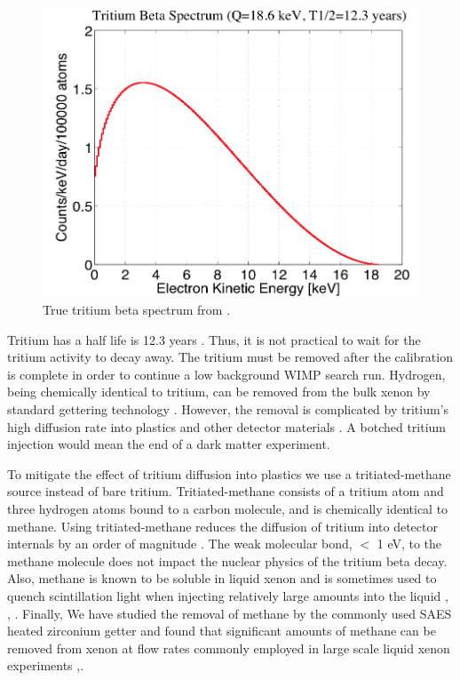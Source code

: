 \begin{figure}[h!]\centering
\includegraphics[width=120mm]{Tritium_Source/Tritium_Spectrum.png}
\caption{True tritium beta spectrum from \cite{Tritium_Eq}. }
\label{fig:True_T_Spec}
\end{figure}


Tritium has a half life is 12.3 years \cite{Tritium_halflife_all}. Thus, it is not practical to wait for the tritium activity to decay away. The tritium must be removed after the calibration is complete in order to continue a low background WIMP search run. Hydrogen, being chemically identical to tritium, can be removed from the bulk xenon by standard gettering technology \cite{SAES}. However, the removal is complicated by tritium's high diffusion rate into plastics and other detector materials \cite{miyake:1983}. A botched tritium injection would mean the end of a dark matter experiment. 

To mitigate the effect of tritium diffusion into plastics we use a tritiated-methane source instead of bare tritium. Tritiated-methane consists of a tritium atom and three hydrogen atoms bound to a carbon molecule, and is chemically identical to methane. Using tritiated-methane reduces the diffusion of tritium into detector internals by an order of magnitude \cite{miyake:1983}. The weak molecular bond,  $<$ 1 eV, to the methane molecule does not impact the nuclear physics of the tritium beta decay. Also, methane is known to be soluble in liquid xenon and is sometimes used to quench scintillation light when injecting relatively large amounts into the liquid \cite{bondar2006two}, \cite{Kirill_Methane}, \cite{Shibamura}. Finally, We have studied the removal of methane by the commonly used SAES heated zirconium getter and found that significant amounts of methane can be removed from xenon at flow rates commonly employed in large scale liquid xenon experiments \cite{Dobi_CH4},\cite{coldtrap}. 



